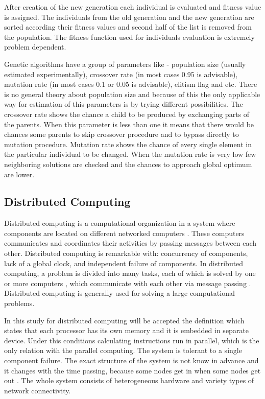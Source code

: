 \documentclass[graybox]{svmult}
\begin{document}
After creation of the new generation each individual is evaluated and fitness value is assigned. The individuals from the old generation and the new generation are sorted according their fitness values and second half of the list is removed from the population. The fitness function used for individuals evaluation is extremely problem dependent. 

Genetic algorithms have a group of parameters like - population size (usually estimated experimentally), crossover rate (in most cases 0.95 is advisable), mutation rate (in most cases 0.1 or 0.05 is advisable), elitism flag and etc. There is no general theory about population size and because of this the only applicable way for estimation of this parameters is by trying different possibilities. The crossover rate shows the chance a child to be produced by exchanging parts of the parents. When this parameter is less than one it means that there would be chances some parents to skip crossover procedure and to bypass directly to mutation procedure. Mutation rate shows the chance of every single element in the particular individual to be changed. When the mutation rate is very low few neighboring solutions are checked and the chances to approach global optimum are lower. 

\subsection{Distributed Computing} \label{Distributed Computing}

Distributed computing is a computational organization in a system where components are located on different networked computers \cite{balabanov01}. These computers communicates and coordinates their activities by passing messages between each other. Distributed computing is remarkable with: concurrency of components, lack of a global clock, and independent failure of components. In distributed computing, a problem is divided into many tasks, each of which is solved by one or more computers \cite{godfrey01}, which communicate with each other via message passing \cite{andrews01}. Distributed computing is generally used for solving a large computational problems. 

In this study for distributed computing will be accepted the definition which states that each processor has its own memory and it is embedded in separate device. Under this conditions calculating instructions run in parallel, which is the only relation with the parallel computing. The system is tolerant to a single component failure. The exact structure of the system is not know in advance and it changes with the time passing, because some nodes get in when some nodes get out \cite{balabanov02}. The whole system consists of heterogeneous hardware and variety types of network connectivity. 
\end{document}
